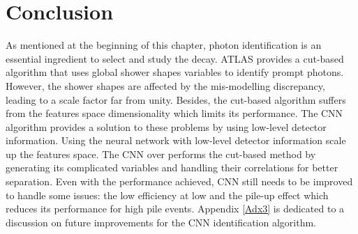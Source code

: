 \section{Conclusion}
\label{gamma:conc}

As mentioned at the beginning of this chapter, photon identification is an essential ingredient to select and study the \HHyybb decay. ATLAS provides a cut-based algorithm that uses global shower shapes variables to identify prompt photons. However, the shower shapes are affected by the mis-modelling discrepancy, leading to a scale factor far from unity. Besides, the cut-based algorithm suffers from the features space dimensionality which limits its performance. The CNN algorithm provides a solution to these problems by using low-level detector information. Using the neural network with low-level detector information scale up the features space. The CNN over performs the cut-based method by generating its complicated variables and handling their correlations for better separation. Even with the performance achieved, CNN still needs to be improved to handle some issues: the low efficiency at low \eT and the pile-up effect which reduces its performance for high pile events. Appendix \ref{Adx3} is dedicated to a discussion on future improvements for the CNN identification algorithm. 

